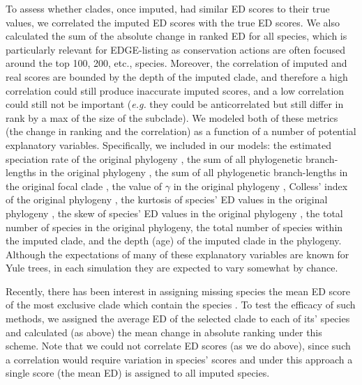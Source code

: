 \documentclass[10pt,english]{article}
\begin{document}
To assess whether clades, once imputed, had similar ED scores to their true
values, we correlated the imputed ED scores with the true ED scores. We also
calculated the sum of the absolute change in ranked ED for all species, which is
particularly relevant for EDGE-listing as conservation actions are often focused
around the top 100, 200, etc., species. Moreover, the correlation of imputed and
real scores are bounded by the depth of the imputed clade, and therefore a high
correlation could still produce inaccurate imputed scores, and a low correlation
could still not be important (\emph{e.g.} they could be anticorrelated but still
differ in rank by a max of the size of the subclade). We modeled both of these
metrics (the change in ranking and the correlation) as a function of a number of
potential explanatory variables. Specifically, we included in our models: the
estimated speciation rate of the original phylogeny \autocite[using
'ape::yule';][]{Paradis2004}, the sum of all phylogenetic branch-lengths
in the original phylogeny \autocite[Faith's PD;][]{Faith1992}, the sum of all
phylogenetic branch-lengths in the original focal clade \autocite[Faith's
PD;][]{Faith1992}, the value of $\gamma$ in the original phylogeny
\autocite[using 'phytools::gammatest';][]{Pybus2000, Revell2012},
Colless' index of the original phylogeny \autocite[using
'apTreeshape::as.treeshape';][]{Colless1982, Bortolussi2009}, the
kurtosis of species' ED values in the original phylogeny \autocite[using
'moments::kurtosis';][]{Komsta2015}, the skew of species' ED values in
the original phylogeny \autocite[using 'moments::skew';][]{Komsta2015},
the total number of species in the original phylogeny, the total number of
species within the imputed clade, and the depth (age) of the imputed clade in
the phylogeny. Although the expectations of many of these explanatory variables
are known for Yule trees, in each simulation they are expected to vary somewhat
by chance.

Recently, there has been interest in assigning missing species the mean ED score
of the most exclusive clade which contain the species
\autocite[see][]{Gumbs2018}. To test the efficacy of such methods, we assigned
the average ED of the selected clade to each of its' species and calculated (as
above) the mean change in absolute ranking under this scheme. Note that we could
not correlate ED scores (as we do above), since such a correlation would require
variation in species' scores and under this approach a single score (the mean
ED) is assigned to all imputed species.
\end{document}
